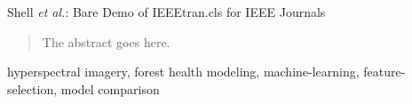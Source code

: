 \documentclass[letterpaper, journal]{IEEEtran}
\begin{document}
%
{Shell \MakeLowercase{\textit{et al.}}: Bare Demo of IEEEtran.cls for IEEE Journals}
%

\maketitle

\begin{abstract}
The abstract goes here.
\end{abstract}

\begin{IEEEkeywords}
hyperspectral imagery, forest health modeling, machine-learning, feature-selection, model comparison
\end{IEEEkeywords}

%
\IEEEpeerreviewmaketitle
\end{document}
